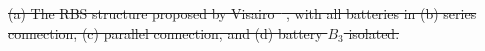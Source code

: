 \documentclass{article}
\providecommand{\DIFdel}[1]{{\protect\color{red}\sout{#1}}}                      %
\providecommand{\DIFdelbegin}{} %
\providecommand{\DIFdelFL}[1]{\DIFdel{#1}} %
\newcommand{\DIFscaledelfig}{0.5}
\newlength{\DIFdelgraphicswidth} %
\newlength{\DIFdelgraphicsheight} %
\newcommand{\DIFdelincludegraphics}[2][]{%
\sbox{\DIFdelgraphicsbox}{\DIFOincludegraphics[#1]{#2}}%
\settoboxwidth{\DIFdelgraphicswidth}{\DIFdelgraphicsbox} %
\settoboxtotalheight{\DIFdelgraphicsheight}{\DIFdelgraphicsbox} %
\scalebox{\DIFscaledelfig}{%
\parbox[b]{\DIFdelgraphicswidth}{\usebox{\DIFdelgraphicsbox}\\[-\baselineskip] \rule{\DIFdelgraphicswidth}{0em}}\llap{\resizebox{\DIFdelgraphicswidth}{\DIFdelgraphicsheight}{%
\setlength{\unitlength}{\DIFdelgraphicswidth}%
\begin{picture}(1,1)%
\thicklines\linethickness{2pt} %
{\color[rgb]{1,0,0}\put(0,0){\framebox(1,1){}}}%
{\color[rgb]{1,0,0}\put(0,0){\line( 1,1){1}}}%
{\color[rgb]{1,0,0}\put(0,1){\line(1,-1){1}}}%
\end{picture}%
}\hspace*{3pt}}} %
} %
\DeclareRobustCommand{\DIFdelbegin}{\DIFOdelbegin \let\includegraphics\DIFdelincludegraphics} %
\begin{document}
\DIFdelbegin %
{%
}
\DIFdelFL{\hspace{0.05\textwidth}
    }%
{%
}
{%
}
\DIFdelFL{\hspace{0.05\textwidth}
    }%
{%
}
{%
\DIFdelFL{(a) The RBS structure proposed by Visairo\mbox{%
\cite{visairoReconfigurableBatteryPack2008}}\hskip0pt%
, with
        all batteries in (b) series connection, (c) parallel connection, and
        (d) battery $B_3$ isolated.
        }}
\end{document}
